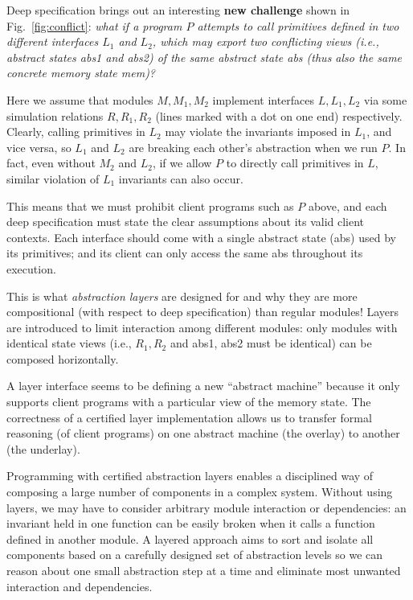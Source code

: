 Deep specification brings out an interesting {\bf new challenge}
shown in Fig.~\ref{fig:conflict}: {\em what if a program $P$ attempts to
call primitives defined in two different interfaces $L_1$ and $L_2$,
which may export two conflicting views (i.e., abstract states
\textsf{abs1} and \textsf{abs2}) of the same abstract state \textsf{abs}
(thus also the same concrete memory state \textsf{mem})?}

Here we assume that modules $M, M_1, M_2$ implement interfaces $L,
L_1, L_2$ via some simulation relations $R, R_1, R_2$ (lines marked
with a dot on one end) respectively. Clearly, calling primitives in
$L_2$ may violate the invariants imposed in $L_1$, and vice versa,
so $L_1$ and $L_2$ are breaking each other's abstraction when we run
$P$. In fact, even without $M_2$ and $L_2$, if we allow $P$ to
directly call primitives in $L$, similar violation of $L_1$ invariants
can also occur.

This means that we must prohibit client programs such as $P$ above,
and each deep specification must state the clear assumptions about its
valid client contexts. Each interface should come with a single
abstract state (\textsf{abs}) used by its primitives; and its client can
only access the same \textsf{abs} throughout its execution. 

This is what {\em abstraction layers} are designed for and why they
are more compositional (with respect to deep specification)
than regular modules! Layers are introduced to limit 
interaction among different modules: only modules with identical
state views (i.e., $R_1, R_2$ and \textsf{abs1},
\textsf{abs2} must be identical) can be composed horizontally.
 
A layer interface seems to be defining a new ``abstract machine''
because it only supports client programs with a particular view of the
memory state. The correctness of a certified layer implementation
allows us to transfer formal reasoning (of client programs) on one
abstract machine (the overlay) to another (the underlay).  

Programming with certified abstraction layers enables a disciplined way of
composing a large number of components in a complex system. Without
using layers, we may have to consider arbitrary module interaction or
dependencies: an invariant held in one function can be easily broken
when it calls a function defined in another module. A layered approach
aims to sort and isolate all components based on a carefully designed
set of abstraction levels so we can reason about one small abstraction
step at a time and eliminate most unwanted interaction and dependencies.